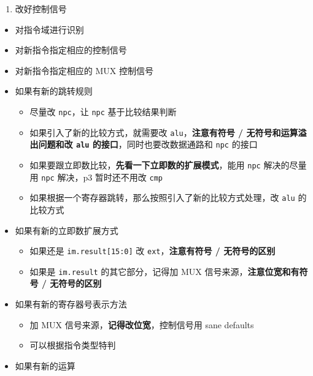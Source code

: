 \documentclass[12pt,AutoFakeBold]{article}
\providecommand{\tightlist}{%
  \setlength{\itemsep}{0pt}\setlength{\parskip}{0pt}}
\begin{document}
\begin{enumerate}
\def\labelenumi{\arabic{enumi}.}
\setcounter{enumi}{2}
\tightlist
\item
  改好控制信号
\end{enumerate}

\begin{itemize}
\tightlist
\item
  对指令域进行识别
\item
  对新指令指定相应的控制信号
\item
  对新指令指定相应的 MUX 控制信号
\item
  如果有新的跳转规则

  \begin{itemize}
  \tightlist
  \item
    尽量改 \texttt{npc}，让 \texttt{npc} 基于比较结果判断
  \item
    如果引入了新的比较方式，就需要改 \texttt{alu}，\textbf{注意有符号 /
    无符号和运算溢出问题和改 \texttt{alu} 的接口}，同时也要改数据通路和
    \texttt{npc} 的接口
  \item
    如果要跟立即数比较，\textbf{先看一下立即数的扩展模式}，能用
    \texttt{npc} 解决的尽量用 \texttt{npc} 解决，p3 暂时还不用改
    \texttt{cmp}
  \item
    如果根据一个寄存器跳转，那么按照引入了新的比较方式处理，改
    \texttt{alu} 的比较方式
  \end{itemize}
\item
  如果有新的立即数扩展方式

  \begin{itemize}
  \tightlist
  \item
    如果还是 \texttt{im.result{[}15:0{]}} 改
    \texttt{ext}，\textbf{注意有符号 / 无符号的区别}
  \item
    如果是 \texttt{im.result} 的其它部分，记得加 MUX
    信号来源，\textbf{注意位宽和有符号 / 无符号的区别}
  \end{itemize}
\item
  如果有新的寄存器号表示方法

  \begin{itemize}
  \tightlist
  \item
    加 MUX 信号来源，\textbf{记得改位宽}，控制信号用 sane defaults
  \item
    可以根据指令类型特判
  \end{itemize}
\item
  如果有新的运算


\end{itemize}
\end{document}
